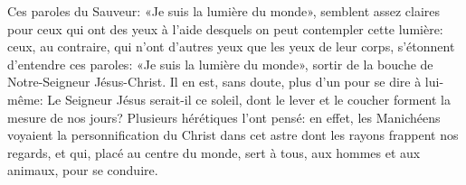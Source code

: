 Ces paroles du Sauveur: «Je suis la lumière du monde»,
	semblent assez claires pour ceux qui ont des yeux
		à l’aide desquels on peut contempler cette lumière:
	ceux, au contraire, qui n’ont d’autres yeux que les yeux de leur corps,
	s’étonnent d’entendre ces paroles: «Je suis la lumière du monde»,
		sortir de la bouche de Notre-Seigneur Jésus-Christ.
Il en est, sans doute, plus d’un pour se dire à lui-même:
	Le Seigneur Jésus serait-il ce soleil,
	dont le lever et le coucher forment la mesure de nos jours?
Plusieurs hérétiques l’ont pensé:
	en effet, les Manichéens voyaient la personnification du Christ
		dans cet astre dont les rayons frappent nos regards,
	et qui, placé au centre du monde,
	sert à tous, aux hommes et aux animaux, pour se conduire.

